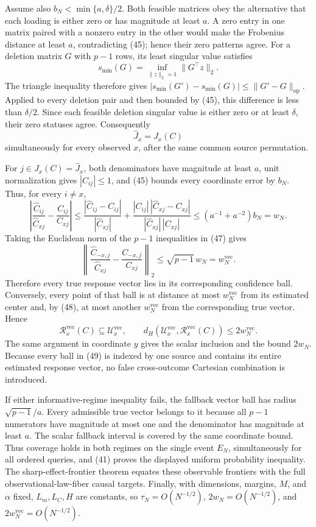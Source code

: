 Assume also \(b_N<\min\{a,\delta\}/2\). Both feasible matrices obey the alternative that each loading is either zero or has magnitude at least \(a\). A zero entry in one matrix paired with a nonzero entry in the other would make the Frobenius distance at least \(a\), contradicting (45); hence their zero patterns agree. For a deletion matrix \(G\) with \(p-1\) rows, its least singular value satisfies
\[
 s_{\min}(G)=\inf_{\lVert z\rVert_2=1}\lVert G^\top z\rVert_2.
\]
The triangle inequality therefore gives \(|s_{\min}(G')-s_{\min}(G)|\le\lVert G'-G\rVert_{\mathrm{op}}\). Applied to every deletion pair and then bounded by (45), this difference is less than \(\delta/2\). Since each feasible deletion singular value is either zero or at least \(\delta\), their zero statuses agree. Consequently
\[
 \widehat J_x=J_x(C) \tag{46}
\]
simultaneously for every observed \(x\), after the same common source permutation.

For \(j\in J_x(C)=\widehat J_x\), both denominators have magnitude at least \(a\), unit normalization gives \(|C_{ij}|\le1\), and (45) bounds every coordinate error by \(b_N\). Thus, for every \(i\ne x\),
\[
 \left|\frac{\widehat C_{ij}}{\widehat C_{xj}}-
 \frac{C_{ij}}{C_{xj}}\right|
 \le\frac{|\widehat C_{ij}-C_{ij}|}{|\widehat C_{xj}|}
 +\frac{|C_{ij}|\,|\widehat C_{xj}-C_{xj}|}
 {|\widehat C_{xj}|\,|C_{xj}|}
 \le(a^{-1}+a^{-2})b_N=w_N. \tag{47}
\]
Taking the Euclidean norm of the \(p-1\) inequalities in (47) gives
\[
 \left\lVert\frac{\widehat C_{-x,j}}{\widehat C_{xj}}-
 \frac{C_{-x,j}}{C_{xj}}\right\rVert_2
 \le\sqrt{p-1}\,w_N=w_N^{\mathrm{vec}}. \tag{48}
\]
Therefore every true response vector lies in its corresponding confidence ball. Conversely, every point of that ball is at distance at most \(w_N^{\mathrm{vec}}\) from its estimated center and, by (48), at most another \(w_N^{\mathrm{vec}}\) from the corresponding true vector. Hence
\[
 \mathcal R_x^{\mathrm{vec}}(C)\subseteq\mathcal U_x^{\mathrm{vec}},
 \qquad
 d_H(\mathcal U_x^{\mathrm{vec}},\mathcal R_x^{\mathrm{vec}}(C))
 \le2w_N^{\mathrm{vec}}. \tag{49}
\]
The same argument in coordinate \(y\) gives the scalar inclusion and the bound \(2w_N\). Because every ball in (49) is indexed by one source and contains its entire estimated response vector, no false cross-outcome Cartesian combination is introduced.

If either informative-regime inequality fails, the fallback vector ball has radius \(\sqrt{p-1}/a\). Every admissible true vector belongs to it because all \(p-1\) numerators have magnitude at most one and the denominator has magnitude at least \(a\). The scalar fallback interval is covered by the same coordinate bound. Thus coverage holds in both regimes on the single event \(E_N\), simultaneously for all ordered queries, and (41) proves the displayed uniform probability inequality. The sharp-effect-frontier theorem equates these observable frontiers with the full observational-law-fiber causal targets. Finally, with dimensions, margins, \(M\), and \(\alpha\) fixed, \(L_m,L_C,H\) are constants, so \(\tau_N=O(N^{-1/2})\), \(2w_N=O(N^{-1/2})\), and \(2w_N^{\mathrm{vec}}=O(N^{-1/2})\).
